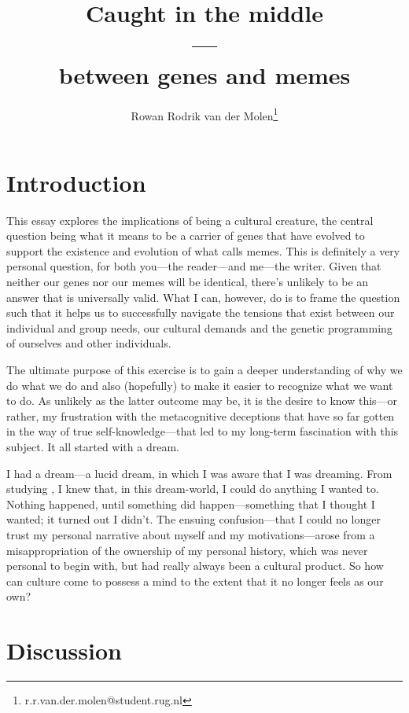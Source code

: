 \documentclass{article}
\title{Caught in the middle\\---\\between genes and memes}
\author{Rowan Rodrik van der Molen\footnote{r.r.van.der.molen@student.rug.nl}}
\begin{document}
\maketitle

\tableofcontents

\section{Introduction}
\label{sec:intro}


This essay explores the implications of being a cultural creature, the central
question being what it means to be a carrier of genes that have evolved to support
the existence and evolution of what \citet{dawkins1976} calls memes. This is
definitely a very personal question, for both you---the reader---and me---the
writer. Given that neither our genes nor our memes will be identical, there's 
unlikely to be an answer that is universally valid. What I can, however, do is
to frame the question such that it helps us to successfully navigate the
tensions that exist between our individual and group needs, our cultural
demands and the genetic programming of ourselves and other individuals.

The ultimate purpose of this exercise is to gain a deeper understanding of why
we do what we do and also (hopefully) to make it easier to recognize what
we want to do. As unlikely as the latter outcome may be, it is the desire to
know this---or rather, my frustration with the metacognitive deceptions that
have so far gotten in the way of true self-knowledge---that led to my long-term
fascination with this subject. It all started with a dream.

I had a dream---a lucid dream, in which I was aware that I was dreaming. From
studying \citet{laberge1990}, I knew that, in this dream-world, I could do
anything I wanted to. Nothing happened, until something did happen---something
that I thought I wanted; it turned out I didn't. The ensuing confusion---that I
could no longer trust my personal narrative about myself and my
motivations---arose from a misappropriation of the ownership of my personal
history, which was never personal to begin with, but had really always been a
cultural product. So how can culture come to possess a mind to the extent that
it no longer feels as our own?

\section{Discussion}
\end{document}
